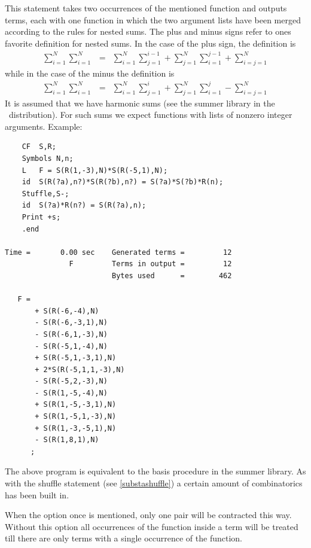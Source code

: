 \noindent This statement 
takes two occurrences of the mentioned function and outputs 
terms, each with one function in which the two argument lists have been 
merged according to the rules for nested sums. The plus and minus signs 
refer to ones favorite definition for nested sums. In the case of the plus 
sign, the definition is
\begin{eqnarray}
    \sum_{i=1}^N \sum_{i=1}^N & = & \sum_{i=1}^N \sum_{j=1}^{i-1}
        + \sum_{j=1}^N \sum_{i=1}^{j-1}
        + \sum_{i=j=1}^N
\end{eqnarray}
\setcounter{equation}{4}
while in the case of the minus the definition is
\begin{eqnarray}
    \sum_{i=1}^N \sum_{i=1}^N & = & \sum_{i=1}^N \sum_{j=1}^{i}
        + \sum_{j=1}^N \sum_{i=1}^{j}
        - \sum_{i=j=1}^N
\end{eqnarray}
\setcounter{equation}{5}
It is assumed that we have harmonic sums (see the 
summer library in the \FORM\ distribution). For such sums we expect 
functions with lists of nonzero integer arguments. Example:
\begin{verbatim}
    CF  S,R;
    Symbols N,n;
    L   F = S(R(1,-3),N)*S(R(-5,1),N);
    id  S(R(?a),n?)*S(R(?b),n?) = S(?a)*S(?b)*R(n);
    Stuffle,S-;
    id  S(?a)*R(n?) = S(R(?a),n);
    Print +s;
    .end

Time =       0.00 sec    Generated terms =         12
               F         Terms in output =         12
                         Bytes used      =        462

   F =
       + S(R(-6,-4),N)
       - S(R(-6,-3,1),N)
       - S(R(-6,1,-3),N)
       - S(R(-5,1,-4),N)
       + S(R(-5,1,-3,1),N)
       + 2*S(R(-5,1,1,-3),N)
       - S(R(-5,2,-3),N)
       - S(R(1,-5,-4),N)
       + S(R(1,-5,-3,1),N)
       + S(R(1,-5,1,-3),N)
       + S(R(1,-3,-5,1),N)
       - S(R(1,8,1),N)
      ;
\end{verbatim}
The above program is equivalent to the basis procedure in the summer 
library. As with the shuffle statement (see 
\ref{substashuffle}) a certain amount of combinatorics has been built in.

When the option once is mentioned, only one pair will be contracted this 
way. Without this option all occurrences of the function inside a term will 
be treated till there are only terms with a single occurrence of the 
function.


